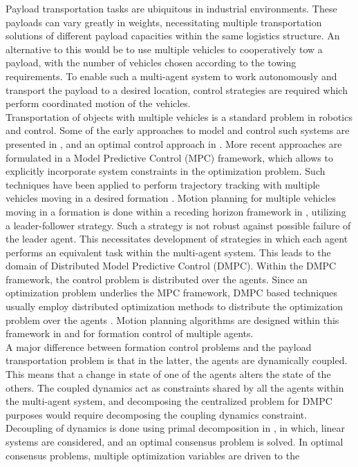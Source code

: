 \documentclass[letterpaper, 10 pt, conference]{ieeeconf}
\begin{document}
Payload transportation tasks are ubiquitous in industrial environments. These payloads can vary greatly in weights, necessitating multiple transportation solutions of different payload capacities within the same logistics structure. An alternative to this would be to use multiple vehicles to cooperatively tow a payload, with the number of vehicles chosen according to the towing requirements. To enable such a multi-agent system to work autonomously and transport the payload to a desired location, control strategies are required which perform coordinated motion of the vehicles.
\\
\indent Transportation of objects with multiple vehicles is a standard problem in robotics and control. Some of the early approaches to model and control such systems are presented in \cite{c1,c2,c3}, and an optimal control approach in \cite{c4}. More recent approaches are formulated in a Model Predictive Control (MPC) framework, which allows to explicitly incorporate system constraints in the optimization problem. Such techniques have been applied to perform trajectory tracking with multiple vehicles moving in a desired formation \cite{c5}. Motion planning for multiple vehicles moving in a formation is done within a receding horizon framework in \cite{c6}, utilizing a leader-follower strategy. Such a strategy is not robust against possible failure of the leader agent. This necessitates development of strategies in which each agent performs an equivalent task within the multi-agent system. This leads to the domain of Distributed Model Predictive Control (DMPC). Within the DMPC framework, the control problem is distributed over the agents. Since an optimization problem underlies the MPC framework, DMPC based techniques usually employ distributed optimization methods to distribute the optimization problem over the agents \cite{c7}. Motion planning algorithms are designed within this framework in \cite{c8} and \cite{c16} for formation control of multiple agents.
\\
\indent
 A major difference between formation control problems and the payload transportation problem is that in the latter, the agents are dynamically coupled. This means that a change in state of one of the agents alters the state of the others. The coupled dynamics act as constraints shared by all the agents within the multi-agent system, and decomposing the centralized problem for DMPC purposes would require decomposing the coupling dynamics constraint. Decoupling of dynamics is done using primal decomposition
 in \cite{c10}, in which, linear systems are considered, and an optimal consensus problem is solved. In optimal consensus problems, multiple optimization variables are driven to the
\end{document}
